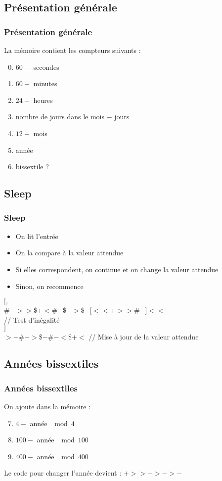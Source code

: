 \documentclass{beamer}
\begin{document}
	\subsection{Présentation générale}
	\begin{frame}
		\frametitle{Présentation générale}
		La mémoire contient les compteurs suivants :
		\pause
		\begin{enumerate}
			\setcounter{enumi}{-1}
			\item $60 -$ secondes
				\pause
			\item $60 -$ minutes
			\item $24 -$ heures
			\item nombre de jours dans le mois $-$ jours
			\item $12 -$ mois
			\item année
			\item bissextile ?
		\end{enumerate}
	\end{frame}

	\subsection{Sleep}
	\begin{frame}
		\frametitle{Sleep}
		
		\begin{itemize}
			\item On lit l'entrée
				\pause
			\item On la compare à la valeur attendue
				\pause
			\item Si elles correspondent, on continue et on change la
				valeur attendue
				\pause
			\item Sinon, on recommence
		\end{itemize}
		\pause
		$[,$\\
			\hspace{1cm} \#$->>$\$$+<$\#$-$\$$+>$\$$-[<<+>>$\#$-]<<$\\ 
			// Test d'inégalité\\
		$]$\\
		$>-$\#$->$\$$-$\#$-<$\$$+<$ // Mise à jour de la valeur attendue
	\end{frame}

	\subsection{Années bissextiles}
	\begin{frame}
		\frametitle{Années bissextiles}
		On ajoute dans la mémoire :
		\pause
		\begin{enumerate}
			\setcounter{enumi}{6}
			\item $4 -$ année $\mod 4$
				\pause
			\item $100 -$ année $\mod 100$ 
				\pause
			\item $400 -$ année $\mod 400$
				\pause
		\end{enumerate}
		\vspace{5mm}
		Le code pour changer l'année devient :
			$+>>->->-$
	\end{frame}
	
\end{document}
